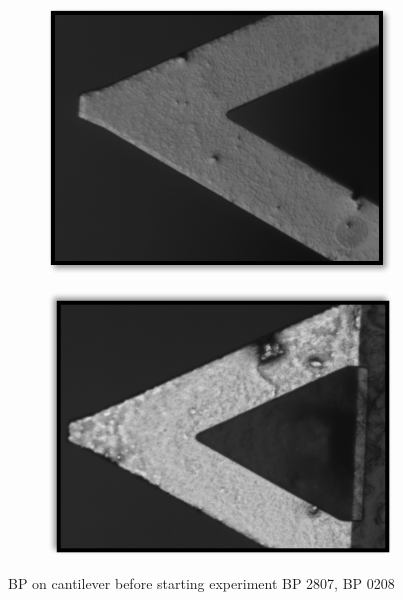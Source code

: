 \documentclass[11pt, a4paper]{article}
\begin{document}
\begin{figure}[h] %
\centering
	\begin{subfigure}{0.245\linewidth}
		\centering
		\includegraphics[width=1\linewidth]{Cantilever/BP_Canti_2807}%
		\caption{}\label{fig:2807}
	\end{subfigure}
	\begin{subfigure}{0.245\linewidth}
		\centering
		\includegraphics[width=1\linewidth]{Cantilever/BP_Canti_0208} %
		\caption{}\label{fig:0208}
	\end{subfigure}
\caption{BP on cantilever before starting experiment  BP 2807,  BP 0208} 
\end{figure}%
\end{document}
